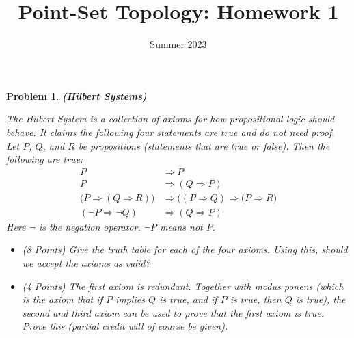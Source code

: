 \documentclass{article}
\title{Point-Set Topology: Homework 1}
\date{Summer 2023}
\theoremstyle{normal}
\newtheorem{problem}{Problem}
\begin{document}
    \maketitle
    \begin{problem}
        \textbf{(Hilbert Systems)}
        \par\hfill\par
        The Hilbert System is a collection of axioms for how propositional
        logic should behave. It claims the following four statements are true
        and do not need proof. Let $P$, $Q$, and $R$ be propositions
        (statements that are true or false). Then the following are true:
        \begin{align}
            P&\Rightarrow{P}\\
            P&\Rightarrow(Q\Rightarrow{P})\\
            \big(P\Rightarrow(Q\Rightarrow{R})\big)
            &\Rightarrow\big((P\Rightarrow{Q})\Rightarrow(P\Rightarrow{R}\big)\\
            (\neg{P}\Rightarrow\neg{Q})&\Rightarrow(Q\Rightarrow{P})
        \end{align}
        Here $\neg$ is the negation operator. $\neg{P}$ means \textit{not} $P$.
        \begin{itemize}
            \item (8 Points) Give the truth table for each of the four axioms.
                Using this, should we accept the axioms as valid?
            \item (4 Points) The first axiom is redundant. Together with
                \textit{modus ponens} (which is the axiom that if $P$ implies
                $Q$ is true, and if $P$ is true, then $Q$ is true), the second
                and third axiom can be used to prove that the first axiom is
                true. Prove this (partial credit will of course be given).
        \end{itemize}
    \end{problem}
\end{document}

